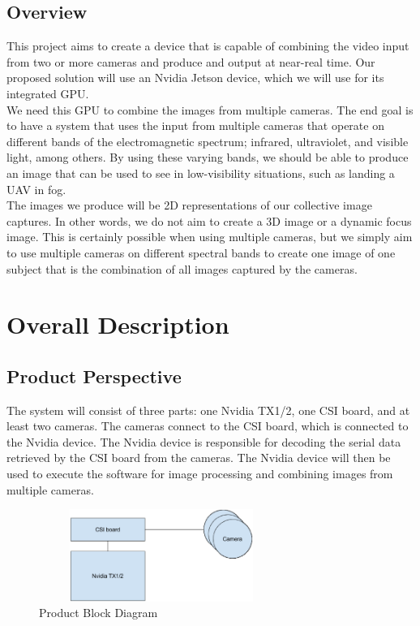 \documentclass[letterpaper,10pt,serif,draftclsnofoot,onecolumn,compsoc,titlepage]{IEEEtran}
\begin{document}
\subsection{Overview}

This project aims to create a device that is capable of combining the video input from 
two or more cameras and produce and output at near-real time. Our proposed solution 
will use an Nvidia Jetson device, which we will use for its integrated GPU.\\

We need this GPU to combine the images from multiple cameras. The end goal is to have 
a system that uses the input from multiple cameras that operate on different bands of 
the electromagnetic spectrum; infrared, ultraviolet, and visible light, among others. 
 By using these varying bands, we should be able to produce an image that can be used 
 to see in low-visibility situations, such as landing a UAV in fog.\\

The images we produce will be 2D representations of our collective image captures. In 
other words, we do not aim to create a 3D image or a dynamic focus image. This is 
certainly possible when using multiple cameras, but we simply aim to use multiple 
cameras on different spectral bands to create one image of one subject that is the 
combination of all images captured by the cameras.\\


\section{Overall Description}

\subsection{Product Perspective}

The system will consist of three parts: one Nvidia TX1/2, one CSI board, and at least 
two cameras. The cameras connect to the CSI board, which is connected to the Nvidia 
device. The Nvidia device is responsible for decoding the serial data retrieved by the 
CSI board from the cameras. The Nvidia device will then be used to execute the 
software for image processing and combining images from multiple cameras.\\

\begin{figure}[H]
	\centering
	\label{fig:CopyOnWriteBefore}
	\includegraphics[width=8cm,height=3cm]{images/block_diagram.eps}
	\caption{Product Block Diagram \label{overflow}}
\end{figure}
\end{document}
